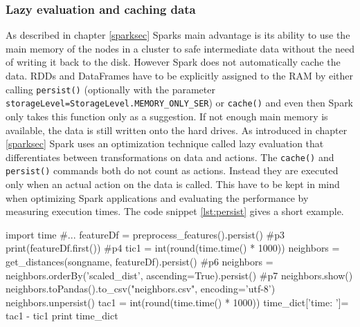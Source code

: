 \subsubsection{Lazy evaluation and caching data}\label{leval}

As described in chapter \ref{sparksec} Sparks main advantage is its ability to use the main memory of the nodes in a cluster to safe intermediate data without the need of writing it back to the disk. However Spark does not automatically cache the data. RDDs and DataFrames have to be explicitly assigned to the RAM by either calling \lstinline{persist()} (optionally with the parameter \lstinline{storageLevel=StorageLevel.MEMORY_ONLY_SER}) or \lstinline{cache()} and even then Spark only takes this function only as a suggestion. If not enough main memory is available, the data is still written onto the hard drives. As introduced in chapter \ref{sparksec} Spark uses an optimization technique called lazy evaluation that differentiates between transformations on data and actions. The \lstinline{cache()} and \lstinline{persist()} commands both do not count as actions. Instead they are executed only when an actual action on the data is called. This have to be kept in mind when optimizing Spark applications and evaluating the performance by measuring execution times. The code snippet \ref{lst:persist} gives a short example. 

\begin{pythonCode}[frame=single,label={lst:persist},caption={Spark lazy evaluation},captionpos=b]
import time
#...
featureDf = preprocess_features().persist()	#p3
print(featureDf.first()) #p4
tic1 = int(round(time.time() * 1000))
neighbors = get_distances(songname, featureDf).persist() #p6
neighbors = neighbors.orderBy('scaled_dist', ascending=True).persist() #p7
neighbors.show()
neighbors.toPandas().to_csv("neighbors.csv", encoding='utf-8')
neighbors.unpersist()
tac1 = int(round(time.time() * 1000))
time_dict['time: ']= tac1 - tic1
print time_dict
\end{pythonCode}

